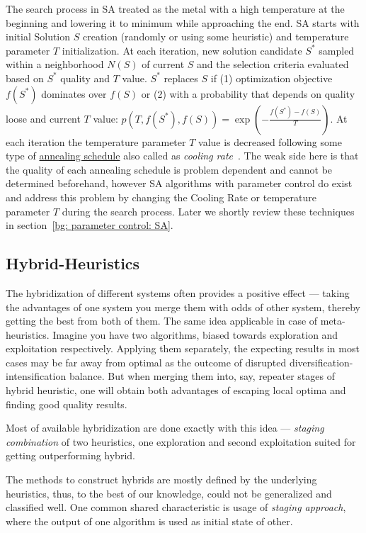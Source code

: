 The search process in SA treated as the metal with a high temperature at the beginning and lowering it to minimum while approaching the end. %
SA starts with initial Solution $S$ creation (randomly or using some heuristic) and temperature parameter \underline{$T$} initialization. At each iteration, new solution candidate $S^*$ sampled within a neighborhood $N(S)$ of current $S$ and the selection criteria evaluated based on $S^*$ quality and $T$ value. $S^*$ replaces $S$ if (1) optimization objective $f(S^*)$ dominates over $f(S)$ or (2) with a probability that depends on quality loose and current $T$ value: $p(T, f(S^*), f(S)) = \exp(-\frac{f(S^*) - f(S)}{T})$. %
At each iteration the temperature parameter $T$ value is decreased following some type of \underline{annealing schedule} also called as \textit{cooling rate}~\cite{boussaid2013survey}. The weak side here is that the quality of each annealing schedule is problem dependent and cannot be determined beforehand, however SA algorithms with parameter control do exist and address this problem by changing the Cooling Rate or temperature parameter $T$ during the search process. Later we shortly review these techniques in section~\ref{bg: parameter control: SA}.


\subsection{Hybrid-Heuristics}
The hybridization of different systems often provides a positive effect — taking the advantages of one system you merge them with odds of other system, thereby getting the best from both of them. The same idea applicable in case of meta-heuristics. Imagine you have two algorithms, biased towards exploration and exploitation respectively. Applying them separately, the expecting results in most cases may be far away from optimal as the outcome of disrupted diversification-intensification balance. But when merging them into, say, repeater stages of hybrid heuristic, one will obtain both advantages of escaping local optima and finding good quality results. 

Most of available hybridization are done exactly with this idea — \textit{staging combination} of two heuristics, one exploration and second exploitation suited for getting outperforming hybrid.

The methods to construct hybrids are mostly defined by the underlying heuristics, thus, to the best of our knowledge, could not be generalized and classified well. One common shared characteristic is usage of \textit{staging approach}, where the output of one algorithm is used as initial state of other. 

